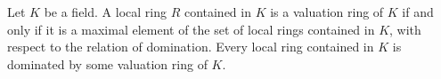 Let $K$ be a field. A local ring $R$ contained in $K$ is a valuation ring of $K$ if and only if it is a maximal element of the set of local rings contained in $K$, with respect to the relation of domination. Every local ring contained in $K$ is dominated by some valuation ring of $K$.
